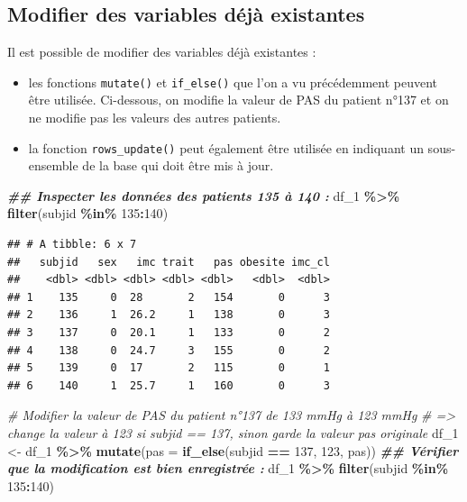 \documentclass[
]{book}
\newenvironment{Shaded}{\begin{snugshade}}{\end{snugshade}}
\newcommand{\AttributeTok}[1]{\textcolor[rgb]{0.13,0.29,0.53}{#1}}
\newcommand{\CommentTok}[1]{\textcolor[rgb]{0.56,0.35,0.01}{\textit{#1}}}
\newcommand{\DecValTok}[1]{\textcolor[rgb]{0.00,0.00,0.81}{#1}}
\newcommand{\DocumentationTok}[1]{\textcolor[rgb]{0.56,0.35,0.01}{\textbf{\textit{#1}}}}
\newcommand{\FunctionTok}[1]{\textcolor[rgb]{0.13,0.29,0.53}{\textbf{#1}}}
\newcommand{\NormalTok}[1]{#1}
\newcommand{\OtherTok}[1]{\textcolor[rgb]{0.56,0.35,0.01}{#1}}
\newcommand{\SpecialCharTok}[1]{\textcolor[rgb]{0.81,0.36,0.00}{\textbf{#1}}}
\providecommand{\tightlist}{%
  \setlength{\itemsep}{0pt}\setlength{\parskip}{0pt}}
\begin{document}
\subsection{Modifier des variables déjà existantes}\label{modifier-des-variables-duxe9juxe0-existantes}

Il est possible de modifier des variables déjà existantes :

\begin{itemize}
\tightlist
\item
  les fonctions \texttt{mutate()} et \texttt{if\_else()} que l'on a vu précédemment peuvent être utilisée. Ci-dessous, on modifie la valeur de PAS du patient n°137 et on ne modifie pas les valeurs des autres patients.
\item
  la fonction \texttt{rows\_update()} peut également être utilisée en indiquant un sous-ensemble de la base qui doit être mis à jour.
\end{itemize}

\begin{Shaded}
\begin{Highlighting}[]
\DocumentationTok{\#\# Inspecter les données des patients 135 à 140 :}
\NormalTok{df\_1 }\SpecialCharTok{\%\textgreater{}\%} \FunctionTok{filter}\NormalTok{(subjid }\SpecialCharTok{\%in\%} \DecValTok{135}\SpecialCharTok{:}\DecValTok{140}\NormalTok{)}
\end{Highlighting}
\end{Shaded}

\begin{verbatim}
## # A tibble: 6 x 7
##   subjid   sex   imc trait   pas obesite imc_cl
##    <dbl> <dbl> <dbl> <dbl> <dbl>   <dbl>  <dbl>
## 1    135     0  28       2   154       0      3
## 2    136     1  26.2     1   138       0      3
## 3    137     0  20.1     1   133       0      2
## 4    138     0  24.7     3   155       0      2
## 5    139     0  17       2   115       0      1
## 6    140     1  25.7     1   160       0      3
\end{verbatim}

\begin{Shaded}
\begin{Highlighting}[]
\CommentTok{\# Modifier la valeur de PAS du patient n°137 de 133 mmHg à 123 mmHg}
\CommentTok{\# =\textgreater{} change la valeur à 123 si subjid == 137, sinon garde la valeur pas originale}
\NormalTok{df\_1 }\OtherTok{\textless{}{-}}\NormalTok{ df\_1 }\SpecialCharTok{\%\textgreater{}\%} \FunctionTok{mutate}\NormalTok{(}\AttributeTok{pas =} \FunctionTok{if\_else}\NormalTok{(subjid }\SpecialCharTok{==} \DecValTok{137}\NormalTok{, }\DecValTok{123}\NormalTok{, pas)) }
\DocumentationTok{\#\# Vérifier que la modification est bien enregistrée :}
\NormalTok{df\_1 }\SpecialCharTok{\%\textgreater{}\%} \FunctionTok{filter}\NormalTok{(subjid }\SpecialCharTok{\%in\%} \DecValTok{135}\SpecialCharTok{:}\DecValTok{140}\NormalTok{)}
\end{Highlighting}
\end{Shaded}
\end{document}
